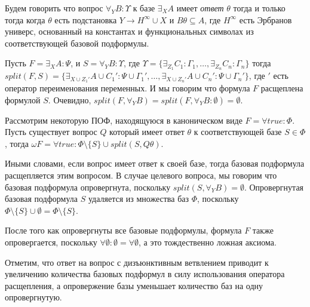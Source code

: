 \begin{definition}[Ответ]
\label{ircond}
Будем говорить что вопрос $\forall_YB\colon\Upsilon$ к базе $\exists_XA$ имеет {\em ответ} $\theta$ тогда и только тогда когда $\theta$ есть подстановка $Y \rightarrow H^{\infty} \cup X$ и $B\theta \subseteq A$, где $H^{\infty}$ есть Эрбранов универс, основанный на константах и функциональных символах из соответствующей базовой подформулы.
\end{definition}

\begin{definition}
\label{splitting}
Пусть $F = \exists_XA\colon\Psi$, и $S = \forall_YB\colon\Upsilon$, где $\Upsilon = \{\exists_{Z_1}C_1\colon\Gamma_1,\ldots,\exists_{Z_n}C_n\colon\Gamma_n\}$ тогда $split(F,S) = \{\exists_{X \cup {Z_1}'} A \cup {C_1}'\colon\Psi \cup {\Gamma_1}',\ldots,\exists_{X \cup {Z_n}'} A \cup {C_n}'\colon\Psi \cup {\Gamma_n}'\}$, где $'$ есть оператор переименования переменных. И мы говорим что формула $F$ расщеплена формулой $S$. Очевидно, $split(F,\forall_YB) = split(F,\forall_YB\colon\emptyset) = \emptyset$.
\end{definition}

\begin{definition}\label{omega}
\label{omegarul}
Рассмотрим некоторую ПОФ, находящуюся в каноническом виде $F = \forall true\colon\Phi$. Пусть существует вопрос $Q$ который имеет ответ $\theta$ к соответствующей базе $S \in \Phi$, тогда $\omega F  = \forall true:\Phi \setminus \{S\} \cup split(S,Q\theta)$.
\end{definition}

Иными словами, если вопрос имеет ответ к своей базе, тогда базовая подформула расщепляется этим вопросом. В случае целевого вопроса, мы говорим что базовая подформула опровергнута, поскольку
$split(S,\forall_YB) = \emptyset$. Опровергнутая базовая подформула $S$ удаляется из множества баз $\Phi$, поскольку $\Phi \setminus \{S\} \cup \emptyset = \Phi \setminus \{S\}$.

После того как опровергнуты все базовые подформулы, формула $F$ также опровергается, поскольку $\forall \emptyset\colon\emptyset = \forall \emptyset$, а это тождественно ложная аксиома.

Отметим, что ответ на вопрос с дизъюнктивным ветвлением приводит к увеличению количества базовых подформул в силу использования оператора расщепления, а опровержение базы уменьшает количество баз на одну опровергнутую.

